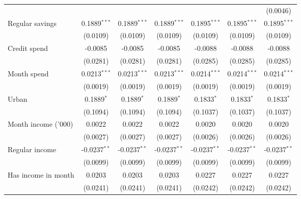 \begin{table}[htbp]
\begin{footnotesize}
\begin{tabular}{lcccccc}
                                          &                &                &                &                &                & (0.0046)\\
         Regular savings                  & 0.1889$^{***}$ & 0.1889$^{***}$ & 0.1889$^{***}$ & 0.1895$^{***}$ & 0.1895$^{***}$ & 0.1895$^{***}$\\
                                          & (0.0109)       & (0.0109)       & (0.0109)       & (0.0109)       & (0.0109)       & (0.0109)\\
         Credit spend                     & -0.0085        & -0.0085        & -0.0085        & -0.0088        & -0.0088        & -0.0088\\
                                          & (0.0281)       & (0.0281)       & (0.0281)       & (0.0285)       & (0.0285)       & (0.0285)\\
         Month spend                      & 0.0213$^{***}$ & 0.0213$^{***}$ & 0.0213$^{***}$ & 0.0214$^{***}$ & 0.0214$^{***}$ & 0.0214$^{***}$\\
                                          & (0.0019)       & (0.0019)       & (0.0019)       & (0.0019)       & (0.0019)       & (0.0019)\\
         Urban                            & 0.1889$^{*}$   & 0.1889$^{*}$   & 0.1889$^{*}$   & 0.1833$^{*}$   & 0.1833$^{*}$   & 0.1833$^{*}$\\
                                          & (0.1094)       & (0.1094)       & (0.1094)       & (0.1037)       & (0.1037)       & (0.1037)\\
         Month income ('000)              & 0.0022         & 0.0022         & 0.0022         & 0.0020         & 0.0020         & 0.0020\\
                                          & (0.0027)       & (0.0027)       & (0.0027)       & (0.0026)       & (0.0026)       & (0.0026)\\
         Regular income                   & -0.0237$^{**}$ & -0.0237$^{**}$ & -0.0237$^{**}$ & -0.0237$^{**}$ & -0.0237$^{**}$ & -0.0237$^{**}$\\
                                          & (0.0099)       & (0.0099)       & (0.0099)       & (0.0099)       & (0.0099)       & (0.0099)\\
         Has income in month              & 0.0203         & 0.0203         & 0.0203         & 0.0227         & 0.0227         & 0.0227\\
                                          & (0.0241)       & (0.0241)       & (0.0241)       & (0.0242)       & (0.0242)       & (0.0242)\\

\end{tabular}
\end{footnotesize}
\end{table}
